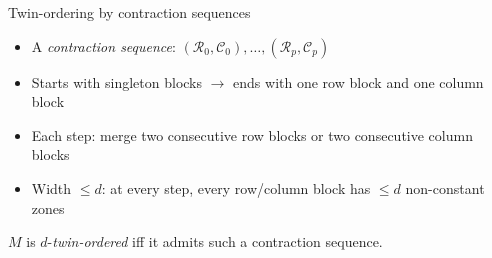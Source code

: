 \documentclass[aspectratio=169,11pt]{beamer}
\renewcommand{\leq}{\leqslant}
\begin{document}
\begin{frame}{Twin-ordering by contraction sequences}
\begin{itemize}
\item A \emph{contraction sequence}: $(\mathcal{R}_0,\mathcal{C}_0),\ldots,(\mathcal{R}_p,\mathcal{C}_p)$
\item Starts with singleton blocks $\to$ ends with one row block and one column block
\item Each step: merge two consecutive row blocks or two consecutive column blocks
\item Width $\leq d$: at every step, every row/column block has $\leq d$ non-constant zones
\end{itemize}

\medskip
\begin{alertblock}{}
$M$ is $d$-\emph{twin-ordered} iff it admits such a contraction sequence.
\end{alertblock}


\end{frame}
\end{document}
